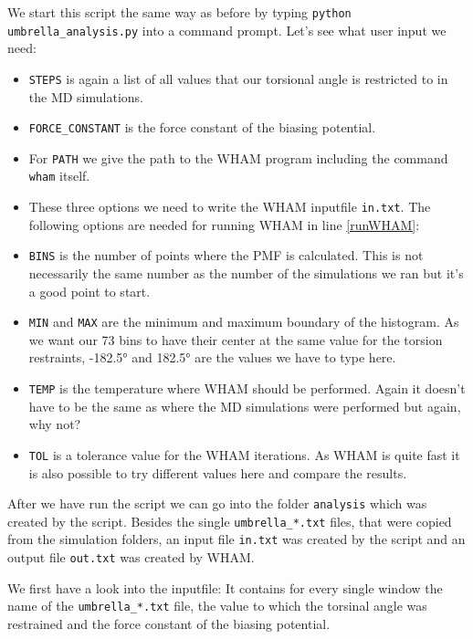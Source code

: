 \documentclass[a4paper,11pt]{scrartcl}
\begin{document}
We start this script the same way as before by typing \texttt{python umbrella\_analysis.py} into a command prompt. Let's see what user input we need:
\begin{itemize}
	\item \texttt{STEPS} is again a list of all values that our torsional angle is restricted to in the MD simulations. 
	\item \texttt{FORCE\_CONSTANT} is the force constant of the biasing potential. 
	\item For \texttt{PATH} we give the path to the WHAM program including the command \texttt{wham} itself. 
	\item These three options we need to write the WHAM inputfile \texttt{in.txt}. The following options are needed for running WHAM in line \ref{runWHAM}:
	\item \texttt{BINS} is the number of points where the PMF is calculated. This is not necessarily the same number as the number of the simulations we ran but it's a good point to start.
	\item \texttt{MIN} and \texttt{MAX} are the minimum and maximum boundary of the histogram. As we want our 73 bins to have their center at the same value for the torsion restraints, -182.5° and 182.5° are the values we have to type here.
	\item \texttt{TEMP} is the temperature where WHAM should be performed. Again it doesn't have to be the same as where the MD simulations were performed but again, why not?
	\item \texttt{TOL} is a tolerance value for the WHAM iterations. As WHAM is quite fast it is also possible to try different values here and compare the results.
\end{itemize}

After we have run the script we can go into the folder \texttt{analysis} which was created by the script. Besides the single \texttt{umbrella\_*.txt} files, that were copied from the simulation folders, an input file \texttt{in.txt} was created by the script and an output file \texttt{out.txt} was created by WHAM. 

We first have a look into the inputfile: It contains for every single window the name of the \texttt{umbrella\_*.txt} file, the value to which the torsinal angle was restrained and the force constant of the biasing potential.
\end{document}
